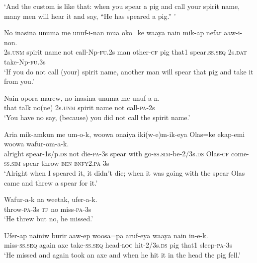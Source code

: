 \glt ‘And the custom is like that: when you spear a pig and call your spirit name, many men will hear it and say,  “He has speared a pig.” ’ \\
\z


\ea
\gll  No  inasina  unuma  me  unuf-i-nan  mua  oko=ke  waaya  nain    mik-ap  nefar  aaw-i-non. \\
2s.\textsc{unm}  spirit  name  not  call-Np-\textsc{fu}.2s  man  other-\textsc{cf}  pig  that1   spear.\textsc{ss.seq}  2s.\textsc{dat}  take-Np-\textsc{fu}.3s \\


\glt ‘If you do not call (your) spirit name, another man will spear that pig and take it from you.’ \\
\z


\ea
\gll  Nain  opora  marew,  no  inasina  unuma  me  unuf-a-n. \\
that  talk  no(ne)  2s.\textsc{unm}  spirit  name  not  call-\textsc{pa}-2s \\
\glt ‘You have no say, (because) you did not call the spirit name.’ \\
\z


\ea
\gll  Aria  mik-amkun  me  um-o-k,  woowa  onaiya  iki(w-e)m-ik-eya       Olas=ke  ekap-emi  woowa  wafur-om-a-k. \\
alright  spear-1s/p.\textsc{ds}  not  die-\textsc{pa}-3s  spear  with  go-\textsc{ss}.\textsc{sim}-be-2/3s.\textsc{ds} Olas-\textsc{cf}  come-\textsc{ss}.\textsc{sim}  spear  throw-\textsc{ben}-\textsc{bnfy}2.\textsc{pa}-3s \\


\glt ‘Alright when I speared it, it didn’t die; when it was going with the spear Olas came and threw a spear for it.’ \\
\z


\ea
\gll  Wafur-a-k  na  weetak,  ufer-a-k. \\
throw-\textsc{pa}-3s  \textsc{tp}  no  miss-\textsc{pa}-3s \\
\glt ‘He threw but no, he missed.’ \\
\z


\ea
\gll  Ufer-ap  nainiw  burir  aaw-ep  woosa=pa  aruf-eya      waaya  nain  in-e-k. \\
miss-\textsc{ss.seq}  again  axe  take-\textsc{ss.seq}  head-\textsc{loc}  hit-2/3s.\textsc{ds}   pig  that1  sleep-\textsc{pa}-3s \\


\glt ‘He missed and again took an axe and when he hit it in the head the pig fell.’ \\
\z


